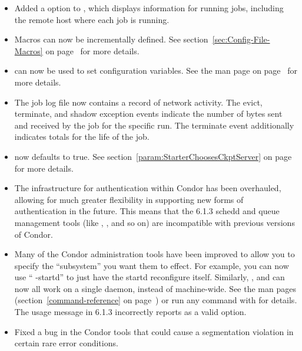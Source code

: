 \begin{itemize}
\item Added a  option to , which displays
information for running jobs, including the remote host where each job
is running.

\item Macros can now be incrementally defined.  See
section~\ref{sec:Config-File-Macros} on
page~\pageref{sec:Config-File-Macros} for more details.

\item {} can now be used to set configuration
variables.  See the man page on page~\pageref{man-condor-config-val}
for more details.

\item The job log file now contains a record of network activity.  The
evict, terminate, and shadow exception events indicate the number of
bytes sent and received by the job for the specific run.  
The terminate event additionally indicates totals for the life of the
job.

\item {} now defaults to true.
See section~\ref{param:StarterChoosesCkptServer} on
page~\pageref{param:StarterChoosesCkptServer} for more details.

\item The infrastructure for authentication within Condor has been
overhauled, allowing for much greater flexibility in supporting new
forms of authentication in the future.
This means that the 6.1.3 schedd and queue management tools (like
, ,  and so on) are incompatible
with previous versions of Condor.

\item Many of the Condor administration tools have been improved to
allow you to specify the ``subsystem'' you want them to effect.  
For example, you can now use `` -startd'' to just
have the startd reconfigure itself.
Similarly, ,  and  can now all 
work on a single daemon, instead of machine-wide.
See the man pages (section~\ref{command-reference} on
page~\pageref{command-reference}) or run any command with 
for details. 
\Note The usage message in 6.1.3 incorrectly reports  as a
valid option.

\item Fixed a bug in the Condor tools that could cause a segmentation
violation in certain rare error conditions.

\end{itemize}


